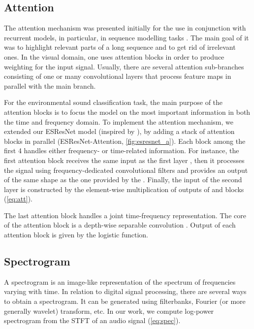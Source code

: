 \documentclass[a4paper,conference]{IEEEtran}
\begin{document}
\subsection{Attention} \label{ssec:attention}
The attention mechanism was presented initially for the use in conjunction with recurrent models, in particular, in sequence modelling tasks \cite{vaswani2017attention}.
The main goal of it was to highlight relevant parts of a long sequence and to get rid of irrelevant ones.
In the visual domain, one uses attention blocks in order to produce weighting for the input signal.
Usually, there are several attention sub-branches consisting of one or many convolutional layers that process feature maps in parallel with the main branch.

For the environmental sound classification task, the main purpose of the attention blocks is to focus the model on the most important information in both the time and frequency domain.
To implement the attention mechanism, we extended our \mbox{ESResNet} model (inspired by \cite{zhang2019crnn}), by adding a stack of attention blocks in parallel (\mbox{ESResNet-Attention}, \autoref{fig:esresnet_a}).
Each block among the first 4 handles either frequency- or time-related information.
For instance, the first attention block  receives the same input as the first layer , then it processes the signal  using frequency-dedicated convolutional filters and provides an output of the same shape as the one provided by the .
Finally, the input of the second layer is constructed by the element-wise multiplication of outputs of  and  blocks (\autoref{eq:att}).



The last attention block handles a joint time-frequency representation.
The core of the attention block is a depth-wise separable convolution \cite{chollet2017xception}.
Output of each attention block is given by the logistic function.

\subsection{Spectrogram} \label{ssec:spec}
A spectrogram is an image-like representation of the spectrum of frequencies varying with time.
In relation to digital signal processing, there are several ways to obtain a spectrogram.
It can be generated using filterbanks, Fourier (or more generally wavelet) transform, etc.
In our work, we compute log-power spectrogram  from the STFT of an audio signal  (\autoref{eq:spec}).
\end{document}
